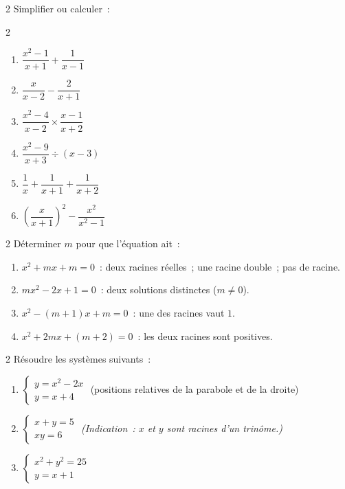 \begin{exo}{2}
Simplifier ou calculer~:
\begin{multicols}{2}
\begin{enumerate}
  \item $\dfrac{x^2-1}{x+1} + \dfrac{1}{x-1}$
  \item $\dfrac{x}{x-2} - \dfrac{2}{x+1}$
  \item $\dfrac{x^2-4}{x-2} \times \dfrac{x-1}{x+2}$
  \item $\dfrac{x^2-9}{x+3} \div (x-3)$
  \item $\dfrac{1}{x} + \dfrac{1}{x+1} + \dfrac{1}{x+2}$
  \item $\left(\dfrac{x}{x+1}\right)^2 - \dfrac{x^2}{x^2-1}$
\end{enumerate}
\end{multicols}
\end{exo}

\begin{exo}{2}
D\'eterminer $m$ pour que l'\'equation ait~:
\begin{enumerate}
  \item $x^2 + mx + m = 0$~: deux racines r\'eelles~; une racine double~; pas de racine.
  \item $mx^2 - 2x + 1 = 0$~: deux solutions distinctes ($m \ne 0$).
  \item $x^2 - (m+1)x + m = 0$~: une des racines vaut $1$.
  \item \ExtensionTTen{} $x^2 + 2mx + (m+2) = 0$~: les deux racines sont positives.
\end{enumerate}
\end{exo}

\begin{exo}{2}
R\'esoudre les syst\`emes suivants~:
\begin{enumerate}
  \item $\begin{cases}y = x^2 - 2x \\ y = x + 4\end{cases}$
        (positions relatives de la parabole et de la droite)
  \item $\begin{cases}x + y = 5 \\ xy = 6\end{cases}$
        \emph{(Indication~: $x$ et $y$ sont racines d'un trin\^ome.)}
  \item $\begin{cases}x^2 + y^2 = 25 \\ y = x + 1\end{cases}$
\end{enumerate}
\end{exo}

